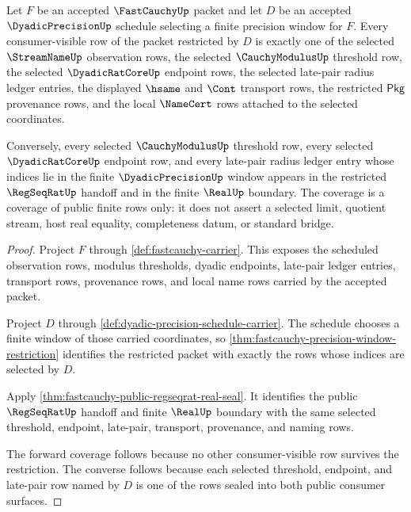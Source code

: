 \begin{theorem}
\label{thm:fastcauchy-dyadicprecision-window-cofinality}
Let $F$ be an accepted $\FastCauchyUp$ packet and let $D$ be an accepted
$\DyadicPrecisionUp$ schedule selecting a finite precision window for $F$.
Every consumer-visible row of the packet restricted by $D$ is exactly one of
the selected $\StreamNameUp$ observation rows, the selected
$\CauchyModulusUp$ threshold row, the selected $\DyadicRatCoreUp$ endpoint
rows, the selected late-pair radius ledger entries, the displayed $\hsame$ and
$\Cont$ transport rows, the restricted $\mathsf{Pkg}$ provenance rows, and the
local $\NameCert$ rows attached to the selected coordinates.

Conversely, every selected $\CauchyModulusUp$ threshold row, every selected
$\DyadicRatCoreUp$ endpoint row, and every late-pair radius ledger entry whose
indices lie in the finite $\DyadicPrecisionUp$ window appears in the restricted
$\RegSeqRatUp$ handoff and in the finite $\RealUp$ boundary. The coverage is a
coverage of public finite rows only: it does not assert a selected limit,
quotient stream, host real equality, completeness datum, or standard bridge.
\end{theorem}
\begin{proof}
Project $F$ through \autoref{def:fastcauchy-carrier}. This exposes the
scheduled observation rows, modulus thresholds, dyadic endpoints, late-pair
ledger entries, transport rows, provenance rows, and local name rows carried by
the accepted packet.

Project $D$ through \autoref{def:dyadic-precision-schedule-carrier}. The
schedule chooses a finite window of those carried coordinates, so
\autoref{thm:fastcauchy-precision-window-restriction} identifies the restricted
packet with exactly the rows whose indices are selected by $D$.

Apply \autoref{thm:fastcauchy-public-regseqrat-real-seal}. It identifies the
public $\RegSeqRatUp$ handoff and finite $\RealUp$ boundary with the same
selected threshold, endpoint, late-pair, transport, provenance, and naming rows.

The forward coverage follows because no other consumer-visible row survives the
restriction. The converse follows because each selected threshold, endpoint,
and late-pair row named by $D$ is one of the rows sealed into both public
consumer surfaces.
\end{proof}

